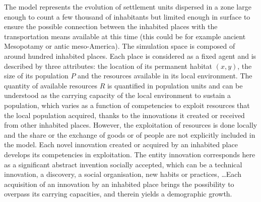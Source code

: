 \documentclass[10pt]{article}
\begin{document}
The model represents the evolution of settlement units dispersed in a zone large enough to count a few thousand of inhabitants but limited enough in surface to ensure the possible connection between the inhabited places with the transportation means available at this time (this could be for example ancient Mesopotamy or antic meso-America). The simulation space is composed of around hundred inhabited places. Each place is considered as a fixed agent and is described by three attributes: the location of its permanent habitat $(x,y)$, the size of its population $P$ and the resources available in its local environment. The quantity of available resources $R$ is quantified in population units and can be understood as the carrying capacity of the local environment to sustain a population, which varies as a function of competencies to exploit resources that the local population acquired, thanks to the innovations it created or received from other inhabited places. However, the exploitation of resources is done locally and the share or the exchange of goods or of people are not explicitly included in the model. Each novel innovation created or acquired by an inhabited place develops its competencies in exploitation. The entity innovation corresponds here as a significant abstract invention socially accepted, which can be a technical innovation, a discovery, a social organisation, new habits or practices, \ldots Each acquisition of an innovation by an inhabited place brings the possibility to overpass its carrying capacities, and therein yields a demographic growth.
\end{document}
